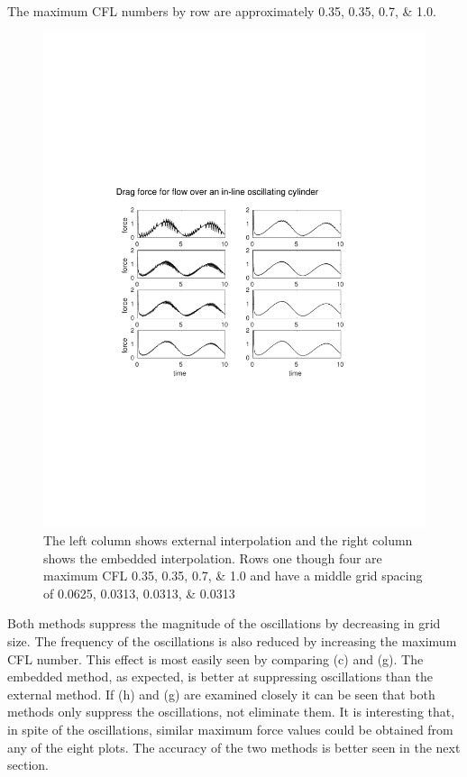 \documentclass[onehalf,11pt]{beavtex}
\begin{document}
The maximum CFL numbers by row are approximately \numlist{0.35; 0.35; 0.7; 1.0}.
\begin{figure}[htb]
	\centering
	\includegraphics[width=\textwidth]{cropped_oscflow}
	\caption{The left column shows external interpolation and the right column shows the embedded interpolation. Rows one though four are maximum CFL \numlist{0.35; 0.35; 0.7; 1.0} and have a middle grid spacing of \numlist{0.0625; 0.0313; 0.0313; 0.0313}}
	\label{fig:osccylinder}
\end{figure}

Both methods suppress the magnitude of the oscillations by decreasing in grid size.
The frequency of the oscillations is also reduced by increasing the maximum CFL number.
This effect is most easily seen by comparing (c) and (g).
The embedded method, as expected, is better at suppressing oscillations than the external method.
If (h) and (g) are examined closely it can be seen that both methods only suppress the oscillations, not eliminate them.
It is interesting that, in spite of the oscillations, similar maximum force values could be obtained from any of the eight plots.
The accuracy of the two methods is better seen in the next section.
\end{document}
